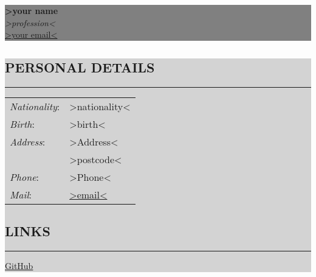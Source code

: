 \documentclass[12pt, a4paper, titlepage]{article}
\newcommand{\mybox}[2]{\par\noindent\colorbox{#1}
{\parbox{\dimexpr\textwidth-2\fboxsep\relax}{#2}}}
\begin{document}
\clearpage

\mybox{grey}{
	\begin{minipage}{.3\textwidth}
	\end{minipage}
	\begin{minipage}{.7\textwidth}
		\textbf{\huge >your name} \\ 
		\textit{\large >profession<} \\
		\href{mailto:>your email<}{>your email<}
	\end{minipage}
}
\begin{minipage}[t]{.36\textwidth}
	\vspace{0pt}
	\mybox{lightGrey}{\begin{flushleft}
			
		\subsection*{PERSONAL DETAILS}
		\hrule
		\vskip2mm
		\begin{tabular}{l l}
			\textit{Nationality}: & >nationality< \\
			\textit{Birth}: & >birth< \\
			\textit{Address}: & >Address< \\
		 & >postcode< \\
			\textit{Phone}: & >Phone< \\
			\textit{Mail}: & \href{mailto:>email<}{>email<}	
		\end{tabular}	
	
		\vskip5mm
	    
	    \leftskip2mm
	    \subsection*{LINKS}
	    \hrule
	    \vskip2mm
	    \href{https://github.com/IjStark}{GitHub} \\
	    
	    \vskip165mm
	\end{flushleft}} 
\end{minipage}
\hfill
\begin{minipage}[t]{.02 \textwidth}
\end{minipage}
\hfill
\end{document}
